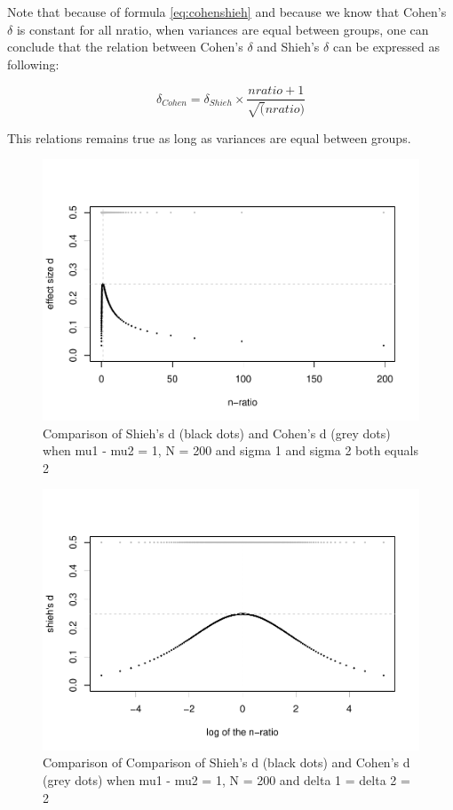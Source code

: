\documentclass[man]{apa6}
\begin{document}
Note that because of formula \ref{eq:cohenshieh} and because we know that Cohen's \(\delta\) is constant for all nratio, when variances are equal between groups, one can conclude that the relation between Cohen's \(\delta\) and Shieh's \(\delta\) can be expressed as following:

\begin{equation} 
\delta_{Cohen}= \delta_{Shieh} \times \frac{nratio+1}{\sqrt(nratio)}
\label{eq:shiehvsmax}
\end{equation}

This relations remains true as long as variances are equal between groups.

\begin{figure}
\centering
\includegraphics{Appendix1_files/figure-latex/SHIEH1-1.pdf}
\caption{\label{fig:SHIEH1}Comparison of Shieh's d (black dots) and Cohen's d (grey dots) when mu1 - mu2 = 1, N = 200 and sigma 1 and sigma 2 both equals 2}
\end{figure}

\begin{figure}
\centering
\includegraphics{Appendix1_files/figure-latex/SHIEH2-1.pdf}
\caption{\label{fig:SHIEH2}Comparison of Comparison of Shieh's d (black dots) and Cohen's d (grey dots) when mu1 - mu2 = 1, N = 200 and delta 1 = delta 2 = 2}
\end{figure}
\end{document}
